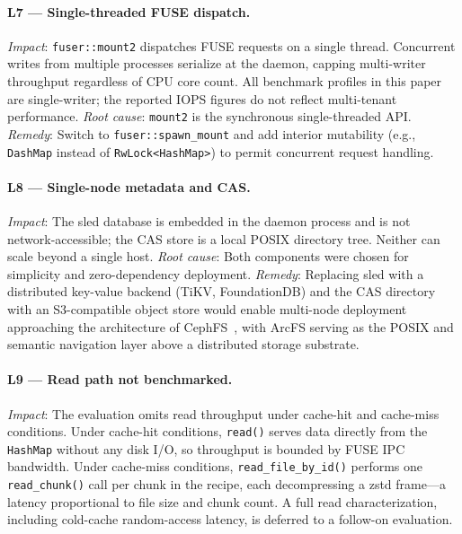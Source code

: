 \documentclass[journal]{IEEEtran}
\begin{document}
\paragraph{L7 — Single-threaded FUSE dispatch.}
\textit{Impact}: \texttt{fuser::mount2} dispatches FUSE requests on a
single thread.  Concurrent writes from multiple processes serialize at
the daemon, capping multi-writer throughput regardless of CPU core count.
All benchmark profiles in this paper are single-writer; the reported
IOPS figures do not reflect multi-tenant performance.  \textit{Root cause}:
\texttt{mount2} is the synchronous single-threaded API.  \textit{Remedy}:
Switch to \texttt{fuser::spawn\_mount} and add interior mutability
(e.g., \texttt{DashMap} instead of \texttt{RwLock<HashMap>}) to permit
concurrent request handling.

\paragraph{L8 — Single-node metadata and CAS.}
\textit{Impact}: The sled database is embedded in the daemon process and
is not network-accessible; the CAS store is a local POSIX directory tree.
Neither can scale beyond a single host.  \textit{Root cause}: Both
components were chosen for simplicity and zero-dependency deployment.
\textit{Remedy}: Replacing sled with a distributed key-value backend
(TiKV, FoundationDB) and the CAS directory with an S3-compatible object
store would enable multi-node deployment approaching the architecture of
CephFS~\cite{weil2006ceph}, with ArcFS serving as the POSIX and semantic
navigation layer above a distributed storage substrate.

\paragraph{L9 — Read path not benchmarked.}
\textit{Impact}: The evaluation omits read throughput under cache-hit and
cache-miss conditions.  Under cache-hit conditions, \texttt{read()}
serves data directly from the \texttt{HashMap} without any disk I/O,
so throughput is bounded by FUSE IPC bandwidth.  Under cache-miss
conditions, \texttt{read\_file\_by\_id()} performs one \texttt{read\_chunk()}
call per chunk in the recipe, each decompressing a zstd frame---a
latency proportional to file size and chunk count.  A full read
characterization, including cold-cache random-access latency, is deferred
to a follow-on evaluation.
\end{document}
